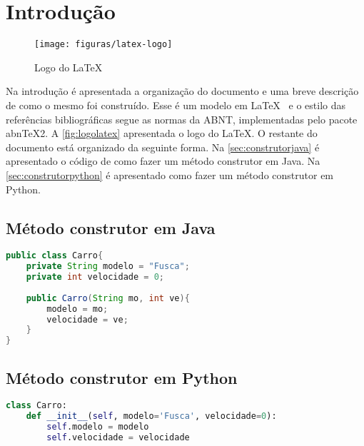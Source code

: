 \documentclass[11pt]{../../classes/ifscarticle}
\begin{document}


\section{Introdução}
\label{sec:introducao}

\lipsum[1]

\begin{figure}[ht]
    \centering
    \texttt{[image: figuras/latex-logo]}
    \caption{Logo do \LaTeX}
    \label{fig:logolatex}
\end{figure}

Na introdução é apresentada a organização do documento e uma breve descrição de como o mesmo foi construído.   Esse é um modelo em \LaTeX~ \cite{lamport94} e o estilo das referências bibliográficas segue as normas da ABNT, implementadas pelo pacote abnTeX2. A \autoref{fig:logolatex} apresentada o logo do \LaTeX. O restante do documento está organizado da seguinte forma. Na \autoref{sec:construtorjava} é apresentado o código de como fazer um método construtor em Java. Na \autoref{sec:construtorpython} é apresentado como fazer um método construtor em Python.

\subsection{Método construtor em Java}
\label{sec:construtorjava}


\begin{lstlisting}[language=java]
public class Carro{
    private String modelo = "Fusca";
    private int velocidade = 0;
    
    public Carro(String mo, int ve){
        modelo = mo;
        velocidade = ve;
    }
}
\end{lstlisting}


\subsection{Método construtor em Python}
\label{sec:construtorpython}


\begin{lstlisting}[language=python]
class Carro:
    def __init__(self, modelo='Fusca', velocidade=0):
        self.modelo = modelo
        self.velocidade = velocidade
\end{lstlisting}







\end{document}
